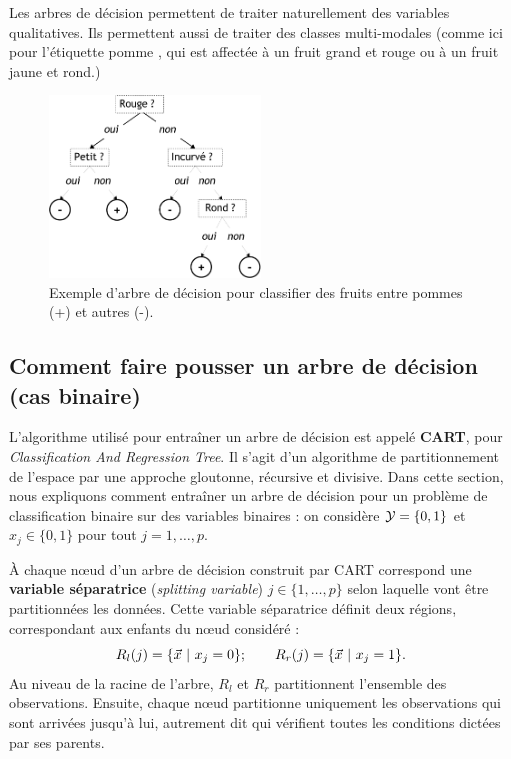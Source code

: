 Les arbres de décision permettent de traiter naturellement des variables
qualitatives. 
Ils permettent aussi de traiter des classes
multi-modales (comme ici pour l'étiquette \og pomme \fg, qui est affectée à un
fruit grand et rouge ou à un fruit jaune et rond.)


\begin{figure}[h]
  \centering
  \includegraphics[width=0.5\textwidth]{figures/nonlin/fruit_tree}
  \caption{Exemple d'arbre de décision pour classifier des fruits entre pommes
    (+) et autres (-).}
  \label{fig:fruit_tree}
\end{figure}



\subsection{Comment faire pousser un arbre de décision (cas binaire)}
\label{sec:grow_tree_binary}
L'algorithme utilisé pour entraîner un arbre de décision est appelé
\textbf{CART}, pour {\it Classification And Regression Tree}. Il s'agit d'un
algorithme de partitionnement de l'espace par une approche gloutonne, récursive
et divisive.
Dans cette section, nous expliquons comment entraîner un arbre de décision pour
un problème de classification binaire sur des variables binaires : on considère
$\mathcal{Y} = \{0, 1\}$ et $x_j \in \{0, 1\}$ pour tout $j=1, \dots, p$. 

À chaque n{\oe}ud d'un arbre de décision construit par CART correspond une
\textbf{variable séparatrice} ({\it splitting variable})
$j \in \{1, \dots, p\}$ selon laquelle vont être partitionnées les
données. Cette variable séparatrice définit deux régions, correspondant aux
enfants du n{\oe}ud considéré :
\begin{equation*}
  R_l(j) = \{\xx~|~x_j = 0\} ; \hspace{2em} 
  R_r(j) =  \{\xx~|~x_j = 1\}.
\end{equation*}
Au niveau de la racine de l'arbre, $R_l$ et $R_r$ partitionnent l'ensemble des
observations. Ensuite, chaque n{\oe}ud partitionne uniquement les observations
qui sont arrivées jusqu'à lui, autrement dit qui vérifient toutes les
conditions dictées par ses parents. 

